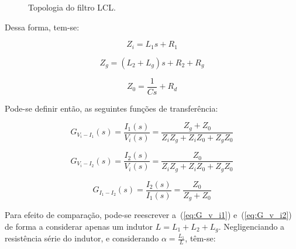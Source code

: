     \begin{figure}[htb]
        \renewcommand\figurename{Fig.}
        \caption{Topologia do filtro LCL.}
        \label{fig:LCL_topologia}
    \end{figure}

    Dessa forma, tem-se:

    \begin{equation*}
        Z_i = L_1s +R_1
    \end{equation*}

    \begin{equation*}
        Z_g = (L_2 + L_g)s + R_2 + R_g
    \end{equation*}

    \begin{equation*}
        Z_0 = \frac{1}{Cs} + R_d
    \end{equation*}

    Pode-se definir então, as seguintes funções de transferência:

    \begin{equation}
        G_{V_i-I_1}(s) = \frac{I_1(s)}{V_i(s)} = \frac{Z_g + Z_0}{Z_iZ_g + Z_iZ_0 + Z_gZ_0}
        \label{eq:G_v_i1}
    \end{equation}

    \begin{equation}
        G_{V_i-I_2}(s) = \frac{I_2(s)}{V_i(s)} = \frac{Z_0}{Z_iZ_g + Z_iZ_0 + Z_gZ_0}
        \label{eq:G_v_i2}
    \end{equation}

    \begin{equation}
        G_{I_1-I_2}(s) = \frac{I_2(s)}{I_1(s)} = \frac{Z_0}{Z_g + Z_0}
        \label{eq:G_i1_i2}
    \end{equation}

    Para efeito de comparação, pode-se reescrever a~(\ref{eq:G_v_i1})
    e~(\ref{eq:G_v_i2}) de forma a considerar apenas um indutor
    $L = L_1 + L_2 + L_g$. Negligenciando a resistência série do indutor,
    e considerando $\alpha = \frac{L_1}{L}$, têm-se:

